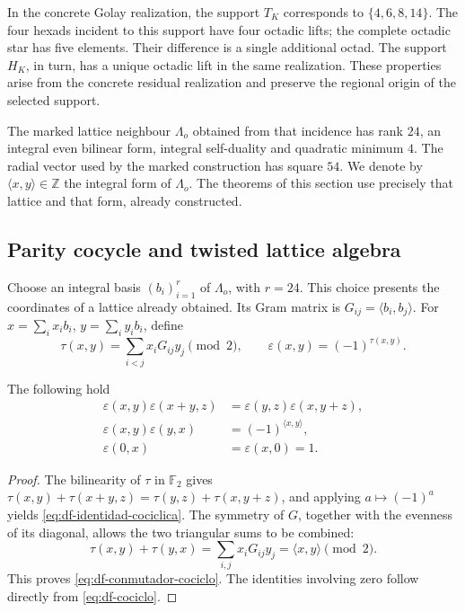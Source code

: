 In the concrete Golay realization, the support \(T_K\) corresponds to \(\{4,6,8,14\}\). The four hexads incident to this support have four octadic lifts; the complete octadic star has five elements. Their difference is a single additional octad. The support \(H_K\), in turn, has a unique octadic lift in the same realization. These properties arise from the concrete residual realization and preserve the regional origin of the selected support.

The marked lattice neighbour \(\Lambda_o\) obtained from that incidence has rank \(24\), an integral even bilinear form, integral self-duality and quadratic minimum \(4\). The radial vector used by the marked construction has square \(54\). We denote by \(\langle x,y\rangle\in\mathbb Z\) the integral form of \(\Lambda_o\). The theorems of this section use precisely that lattice and that form, already constructed.

\subsection{Parity cocycle and twisted lattice algebra}
\label{subsec:df-cociclo}


Choose an integral basis \((b_i)_{i=1}^{r}\) of \(\Lambda_o\), with \(r=24\). This choice presents the coordinates of a lattice already obtained. Its Gram matrix is \(G_{ij}=\langle b_i,b_j\rangle\). For \(x=\sum_i x_i b_i\), \(y=\sum_i y_i b_i\), define
\begin{equation}
 \tau(x,y)=\sum_{i<j}x_iG_{ij}y_j\pmod2,
 \qquad \varepsilon(x,y)=(-1)^{\tau(x,y)}.
 \label{eq:df-cociclo}
\end{equation}

\begin{proposition}
\label{prop:df-cociclo}
The following hold
\begin{align}
 \varepsilon(x,y)\varepsilon(x+y,z)
 &=\varepsilon(y,z)\varepsilon(x,y+z),\label{eq:df-identidad-cociclica}\\
 \varepsilon(x,y)\varepsilon(y,x)
 &=(-1)^{\langle x,y\rangle},\label{eq:df-conmutador-cociclo}\\
 \varepsilon(0,x)&=\varepsilon(x,0)=1.
\end{align}
\end{proposition}

\begin{proof}
The bilinearity of \(\tau\) in \(\mathbb F_2\) gives \(\tau(x,y)+\tau(x+y,z)=\tau(y,z)+\tau(x,y+z)\), and applying \(a\mapsto(-1)^a\) yields \eqref{eq:df-identidad-cociclica}. The symmetry of \(G\), together with the evenness of its diagonal, allows the two triangular sums to be combined:
\[
 \tau(x,y)+\tau(y,x)
 =\sum_{i,j}x_iG_{ij}y_j
 =\langle x,y\rangle\pmod2.
\]
This proves \eqref{eq:df-conmutador-cociclo}. The identities involving zero follow directly from \eqref{eq:df-cociclo}.
\end{proof}

